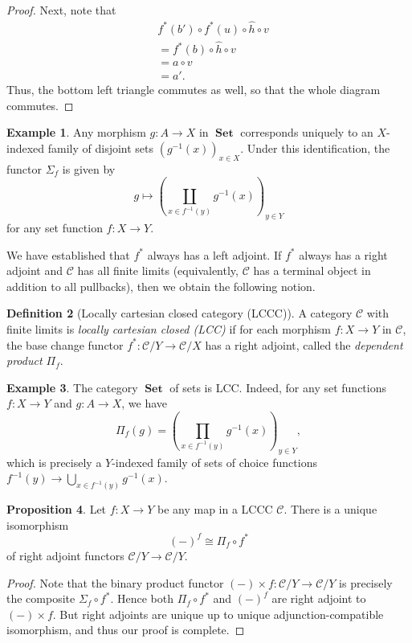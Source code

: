 \documentclass[10pt,letterpaper,cm]{nupset}
\theoremstyle{definition}
\newtheorem{definition}{Definition}[subsection]
\newtheorem{exmp}[definition]{Example}
\theoremstyle{theorem}
\newtheorem{prop}[definition]{Proposition}
\theoremstyle{remark}
\newcommand{\0}{\mathbf{0}}
\newcommand{\1}{\mathbf{1}}
\newcommand{\2}{\mathbf{2}}
\DeclareMathOperator{\set}{\mathbf{Set}}
\renewcommand{\c}{\mathscr{C}}
\begin{document}
\begin{proof}
Next, note that 
\begin{align*}
& f^{\ast}(b') \circ  f^{\ast}(u) \circ \hat{h} \circ v
\\ & = f^{\ast}(b) \circ \hat{h} \circ v
\\ & = a \circ v
\\ &  = a'.
\end{align*}
Thus, the bottom left triangle commutes as well, so that the whole diagram commutes. 
\end{proof}

\begin{exmp}
Any  morphism $g: A \to X$ in $\set$ corresponds uniquely to an $X$-indexed family of disjoint sets $\left(g^{-1}(x)\right)_{x\in X}$. Under this identification, the functor $\Sigma_f$ is given by $$g \mapsto \left(\coprod_{x\in f^{-1}(y)} g^{-1}(x)\right)_{y\in Y} $$ for any set function $f: X \to Y$.
\end{exmp}

\medskip
We have established that $f^{\ast}$ always has a left adjoint. If $f^{\ast}$ always has a right adjoint and $\c$ has all finite limits (equivalently, $\c$ has a terminal object in addition to all pullbacks), then we obtain the following notion.  


\begin{definition}[Locally cartesian closed category (LCCC)]
A category $\c$ with finite limits is \textit{locally cartesian closed (LCC)} if for each morphism $f: X \to Y$ in $\c$, the base change functor $f^{\ast}: \c/Y \to \c/X$ has a right adjoint, called the \textit{dependent product $\Pi_f$}.
\end{definition}

\begin{exmp}
The category $\set$ of sets is LCC. Indeed, for any set functions $f: X \to Y$ and $g: A \to X$, we have $$\Pi_f(g)  = \left(\prod_{x \in f^{-1}(y)} g^{-1}(x)\right)_{y \in Y},$$ which is precisely a $Y$-indexed family of sets of choice functions $f^{-1}(y) \to \bigcup_{x \in f^{-1}(y)}g^{-1}(x)$.
\end{exmp}

\begin{prop}\label{inthom}
Let $f: X\to Y$ be any map in a LCCC $\c$. There is a unique isomorphism $$\left({-}\right)^f \cong \Pi_f \circ f^{\ast}$$ of right adjoint functors $\c/Y \to \c/Y$.
\end{prop}
\begin{proof}
Note that the binary product functor $\left({-}\right)\times f : \c/Y\to \c/Y$ is precisely the composite $\Sigma_f \circ f^{\ast}$. Hence  both $\Pi_f \circ f^{\ast}$ and $\left({-}\right)^f$ are right adjoint to $\left({-}\right)\times f$. But right adjoints are unique up to unique adjunction-compatible isomorphism, and thus our proof is complete. 
\end{proof}
\end{document}
